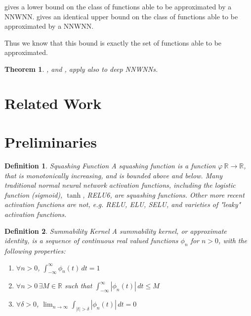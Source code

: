 \documentclass{article} %
\newtheorem{thm}{Theorem}
\newtheorem{defn}{Definition}
\newcommand{\R}{\mathbb{R}}
\begin{document}
  gives a lower bound on the class of functions able to be approximated by a NNWNN.
 gives an identical upper bound on the class of functions able to be approximated by a NNWNN.

Thus we know that this bound is exactly the set of functions able to be approximated.

\begin{thm}\label{thm:deep}
	,  and ,
	apply also to deep NNWNNs.
\end{thm}

\section{Related Work}

\section{Preliminaries}

\begin{defn}{Squashing Function}
A squashing function is a function $\varphi\:\R \to \R$, that is monotonically increasing, and is bounded above and below.
Many traditional normal neural network activation functions, including the logistic function (sigmoid), $\tanh$, RELU6, are squashing functions.
Other more recent activation functions are not, e.g. RELU, ELU, SELU, and varieties of "leaky" activation functions.
\end{defn}

\begin{defn}{Summability Kernel}
A summability kernel, or approximate identity, is a sequence of continuous real valued functions $\phi_n$ for $n>0$, with the following properties:
\begin{enumerate}
	\item $\forall n>0$, $\int_{-\infty}^{\infty}\phi_{n}(t)\,dt=1$
	\item $\forall n>0\, \exists M \in \R$ such that $\int_{-\infty}^{\infty}|\phi_{n}(t)|\,dt\le M$
	\item $\forall \delta > 0$, ${\displaystyle \lim_{n\to\infty}}\int_{|t|>\delta}|\phi_{n}(t)|\,dt = 0$
\end{enumerate}
\end{defn}
\end{document}
